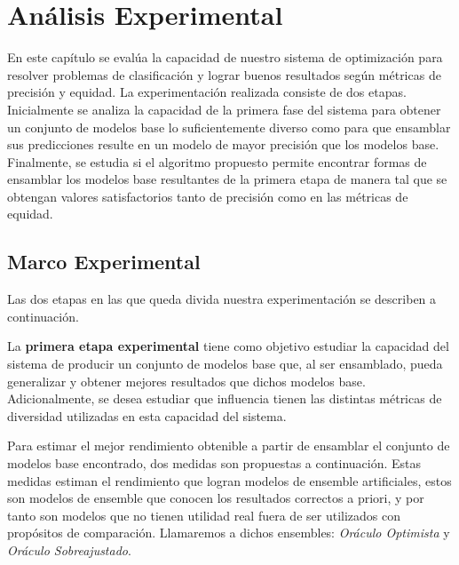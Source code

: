 \chapter{Análisis Experimental}\label{chapter:experiments}

En este capítulo se evalúa la capacidad de nuestro sistema de optimización para resolver problemas de clasificación y lograr buenos resultados según métricas de precisión y equidad.
La experimentación realizada consiste de dos etapas.
Inicialmente se analiza la capacidad de la primera fase del sistema para obtener un conjunto de modelos base lo suficientemente diverso como para que ensamblar sus predicciones resulte en un modelo de mayor precisión que los modelos base.
Finalmente, se estudia si el algoritmo propuesto permite encontrar formas de ensamblar los modelos base resultantes de la primera etapa de manera tal que se obtengan valores satisfactorios tanto de precisión como en las métricas de equidad.

\section{Marco Experimental}\label{section:experimental-framework}

Las dos etapas en las que queda divida nuestra experimentación se describen a continuación.

La \textbf{primera etapa experimental} tiene como objetivo estudiar la capacidad del sistema de producir un conjunto de modelos base que, al ser ensamblado, pueda generalizar y obtener mejores resultados que dichos modelos base.
Adicionalmente, se desea estudiar que influencia tienen las distintas métricas de diversidad utilizadas en esta capacidad del sistema.

Para estimar el mejor rendimiento obtenible a partir de ensamblar el conjunto de modelos base encontrado, dos medidas son propuestas a continuación.
Estas medidas estiman el rendimiento que logran modelos de ensemble artificiales, estos son modelos de ensemble que conocen los resultados correctos a priori, y por tanto son modelos que no tienen utilidad real fuera de ser utilizados con propósitos de comparación.
Llamaremos a dichos ensembles: \emph{Oráculo Optimista} y \emph{Oráculo Sobreajustado}.

